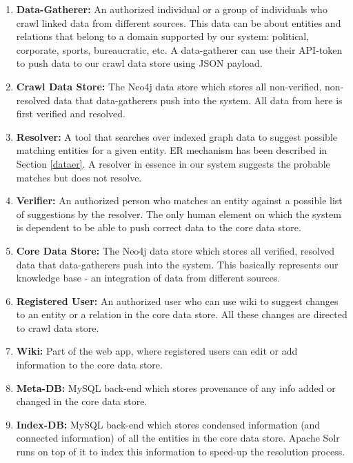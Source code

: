 \begin{enumerate}
    
    \item \textbf{Data-Gatherer:} An authorized individual or a group of individuals who crawl linked data from different sources. This data can be about entities and relations that belong to a domain supported by our system: political, corporate, sports, bureaucratic, etc. A data-gatherer can use their API-token to push data to our crawl data store using JSON payload.

    \item \textbf{Crawl Data Store:} The Neo4j data store which stores all non-verified, non-resolved data that data-gatherers push into the system. All data from here is first verified and resolved.

    \item \textbf{Resolver:} A tool that searches over indexed graph data to suggest possible matching entities for a given entity. ER mechanism has been described in Section \ref{dataer}. A resolver in essence in our system suggests the probable matches but does not resolve.

    \item \textbf{Verifier:} An authorized person who matches an entity against a possible list of suggestions by the resolver. The only human element on which the system is dependent to be able to push correct data to the core data store.

    \item \textbf{Core Data Store:} The Neo4j data store which stores all verified, resolved data that data-gatherers push into the system.  This basically represents our knowledge base - an integration of data from different sources.

    \item \textbf{Registered User:} An authorized user who can use wiki to suggest changes to an entity or a relation in the core data store. All these changes are directed to crawl data store. 

    \item \textbf{Wiki:} Part of the web app, where registered users can edit or add information to the core data store.

    \item \textbf{Meta-DB:} MySQL back-end which stores provenance of any info added or changed in the core data store.

    \item \textbf{Index-DB:} MySQL back-end which stores condensed information (and connected information) of all the entities in the core data store. Apache Solr runs on top of it to index this information to speed-up the resolution process. 


\end{enumerate}
